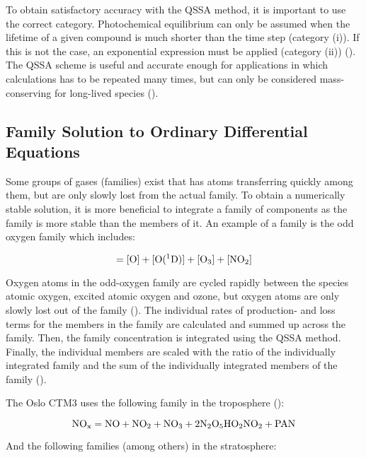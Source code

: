 To obtain satisfactory accuracy with the QSSA method, it is important to use the correct category. Photochemical equilibrium can only be assumed when the lifetime of a given compound is much shorter than the time step (category (i)). If this is not the case, an exponential expression must be applied (category (ii)) (\cite{Hesstvedt1978}). The QSSA scheme is useful and accurate enough for applications in which calculations has to be repeated many times, but can only  be considered mass-conserving for long-lived species (\cite{AtmModFund}). 

\subsection{Family Solution to Ordinary Differential Equations}\label{sec:families}

Some groups of gases (families) exist that has atoms transferring quickly among them, but are only slowly lost from the actual family. To obtain a numerically stable solution, it is more beneficial to integrate a family of components as the family is more stable than the members of it. An example of a family is the odd oxygen family which includes: 

\begin{equation*}
    [\chem{O_T}] = [\chem{O}] + [\chem{O(^1D})] + [\chem{O_3}] + [\chem{NO_2}]
\end{equation*}

Oxygen atoms in the odd-oxygen family are cycled rapidly between the species atomic oxygen, excited atomic oxygen and ozone, but oxygen atoms are only slowly lost out of the family (\cite{AtmModFund}). The individual rates of production- and loss terms for the members in the family are calculated and summed up across the family. Then, the family concentration is integrated using the QSSA method. Finally, the individual members are scaled with the ratio of the individually integrated family and the sum of the individually integrated members of the family (\cite{SovdeManual}).

\medskip

The Oslo CTM3 uses the following family in the troposphere (\cite{SovdeManual}): 

\begin{equation*}
    \mathrm{NO_x} = \mathrm{NO} + \mathrm{NO_2} + \mathrm{NO_3} + 2\mathrm{N_2O_5} \mathrm{HO_2NO_2} + \mathrm{PAN}    
\end{equation*}

And the following families (among others) in the stratosphere:


